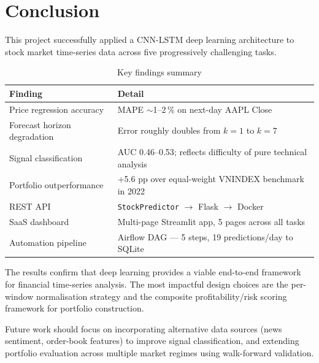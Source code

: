 \documentclass[12pt,a4paper]{article}
\begin{document}
\section{Conclusion}

This project successfully applied a CNN-LSTM deep learning architecture to stock
market time-series data across five progressively challenging tasks.

\begin{table}[H]
\centering
\caption{Key findings summary}
\begin{tabularx}{\linewidth}{lX}
\toprule
\textbf{Finding} & \textbf{Detail} \\
\midrule
Price regression accuracy  & MAPE $\sim$1--2\,\% on next-day AAPL Close \\
Forecast horizon degradation & Error roughly doubles from $k=1$ to $k=7$ \\
Signal classification      & AUC 0.46--0.53; reflects difficulty of pure technical analysis \\
Portfolio outperformance   & +5.6 pp over equal-weight VNINDEX benchmark in 2022 \\
REST API                   & \texttt{StockPredictor} $\to$ Flask $\to$ Docker \\
SaaS dashboard             & Multi-page Streamlit app, 5 pages across all tasks \\
Automation pipeline        & Airflow DAG --- 5 steps, 19 predictions/day to SQLite \\
\bottomrule
\end{tabularx}
\end{table}

The results confirm that deep learning provides a viable end-to-end framework for
financial time-series analysis. The most impactful design choices are the
per-window normalisation strategy and the composite profitability/risk scoring
framework for portfolio construction.

Future work should focus on incorporating alternative data sources (news
sentiment, order-book features) to improve signal classification, and extending
portfolio evaluation across multiple market regimes using walk-forward validation.

\end{document}
